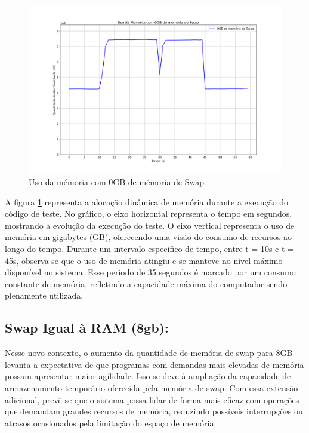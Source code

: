 \documentclass[
	12pt,				%
	openright,			%
	oneside,			%
	a4paper,			%
	chapter=TITLE,		%
	english,			%
	french,				%
	spanish,			%
	brazil				%
	]{abntex2}
\theoremstyle{definition}
\begin{document}
\begin{figure}[H]
	\centering
	\includegraphics[width=1.0\textwidth]{0gb_swap.png}
	\caption{Uso da mémoria com 0GB de mémoria de Swap}
	\label{fig:testes_swap0}
\end{figure}

A figura \ref{fig:testes_swap0} representa a alocação dinâmica de memória durante a execução do código de teste. No gráfico, o eixo horizontal 
representa o tempo em segundos, mostrando a evolução da execução do teste. O eixo vertical representa o uso de memória 
em gigabytes (GB), oferecendo uma visão do consumo de recursos ao longo do tempo. Durante um intervalo específico de tempo, entre 
t = 10s e t = 45s, observa-se que o uso de memória atingiu e se manteve no nível máximo disponível no sistema. Esse período de 35
segundos é marcado por um consumo constante de memória, refletindo a capacidade máxima do computador sendo plenamente utilizada.

\subsection{Swap Igual à RAM (8gb):}
Nesse novo contexto, o aumento da quantidade de memória de swap para 8GB levanta a expectativa de que programas com demandas mais elevadas 
de memória possam apresentar maior agilidade. Isso se deve à ampliação da capacidade de armazenamento temporário oferecida
pela memória de swap. Com essa extensão adicional, prevê-se que o sistema possa lidar de forma mais eficaz com operações que 
demandam grandes recursos de memória, reduzindo possíveis interrupções ou atrasos ocasionados pela limitação do espaço de memória.
\end{document}
